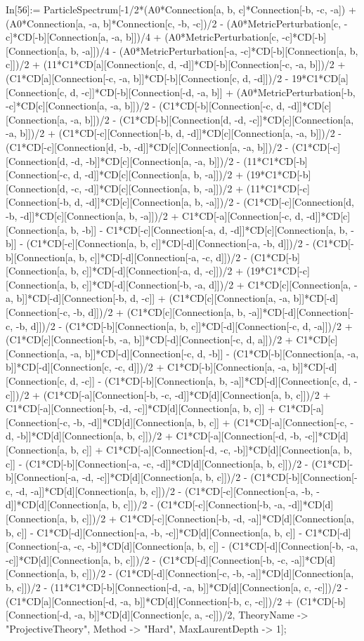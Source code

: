 In[56]:= ParticleSpectrum[-1/2*(A0*Connection[a, b, c]*Connection[-b, -c, -a]) + (A0*Connection[a, -a, b]*Connection[c, -b, -c])/2 - (A0*MetricPerturbation[c, -c]*CD[-b][Connection[a, -a, b]])/4 + (A0*MetricPerturbation[c, -c]*CD[-b][Connection[a, b, -a]])/4 - (A0*MetricPerturbation[-a, -c]*CD[-b][Connection[a, b, c]])/2 + (11*C1*CD[a][Connection[c, d, -d]]*CD[-b][Connection[-c, -a, b]])/2 + (C1*CD[a][Connection[-c, -a, b]]*CD[-b][Connection[c, d, -d]])/2 - 19*C1*CD[a][Connection[c, d, -c]]*CD[-b][Connection[-d, -a, b]] + (A0*MetricPerturbation[-b, -c]*CD[c][Connection[a, -a, b]])/2 - (C1*CD[-b][Connection[-c, d, -d]]*CD[c][Connection[a, -a, b]])/2 - (C1*CD[-b][Connection[d, -d, -c]]*CD[c][Connection[a, -a, b]])/2 + (C1*CD[-c][Connection[-b, d, -d]]*CD[c][Connection[a, -a, b]])/2 - (C1*CD[-c][Connection[d, -b, -d]]*CD[c][Connection[a, -a, b]])/2 - (C1*CD[-c][Connection[d, -d, -b]]*CD[c][Connection[a, -a, b]])/2 - (11*C1*CD[-b][Connection[-c, d, -d]]*CD[c][Connection[a, b, -a]])/2 + (19*C1*CD[-b][Connection[d, -c, -d]]*CD[c][Connection[a, b, -a]])/2 + (11*C1*CD[-c][Connection[-b, d, -d]]*CD[c][Connection[a, b, -a]])/2 - (C1*CD[-c][Connection[d, -b, -d]]*CD[c][Connection[a, b, -a]])/2 + C1*CD[-a][Connection[-c, d, -d]]*CD[c][Connection[a, b, -b]] - C1*CD[-c][Connection[-a, d, -d]]*CD[c][Connection[a, b, -b]] - (C1*CD[-c][Connection[a, b, c]]*CD[-d][Connection[-a, -b, d]])/2 - (C1*CD[-b][Connection[a, b, c]]*CD[-d][Connection[-a, -c, d]])/2 - (C1*CD[-b][Connection[a, b, c]]*CD[-d][Connection[-a, d, -c]])/2 + (19*C1*CD[-c][Connection[a, b, c]]*CD[-d][Connection[-b, -a, d]])/2 + C1*CD[c][Connection[a, -a, b]]*CD[-d][Connection[-b, d, -c]] + (C1*CD[c][Connection[a, -a, b]]*CD[-d][Connection[-c, -b, d]])/2 + (C1*CD[c][Connection[a, b, -a]]*CD[-d][Connection[-c, -b, d]])/2 - (C1*CD[-b][Connection[a, b, c]]*CD[-d][Connection[-c, d, -a]])/2 + (C1*CD[c][Connection[-b, -a, b]]*CD[-d][Connection[-c, d, a]])/2 + C1*CD[c][Connection[a, -a, b]]*CD[-d][Connection[-c, d, -b]] - (C1*CD[-b][Connection[a, -a, b]]*CD[-d][Connection[c, -c, d]])/2 + C1*CD[-b][Connection[a, -a, b]]*CD[-d][Connection[c, d, -c]] - (C1*CD[-b][Connection[a, b, -a]]*CD[-d][Connection[c, d, -c]])/2 + (C1*CD[-a][Connection[-b, -c, -d]]*CD[d][Connection[a, b, c]])/2 + C1*CD[-a][Connection[-b, -d, -c]]*CD[d][Connection[a, b, c]] + C1*CD[-a][Connection[-c, -b, -d]]*CD[d][Connection[a, b, c]] + (C1*CD[-a][Connection[-c, -d, -b]]*CD[d][Connection[a, b, c]])/2 + C1*CD[-a][Connection[-d, -b, -c]]*CD[d][Connection[a, b, c]] + C1*CD[-a][Connection[-d, -c, -b]]*CD[d][Connection[a, b, c]] - (C1*CD[-b][Connection[-a, -c, -d]]*CD[d][Connection[a, b, c]])/2 - (C1*CD[-b][Connection[-a, -d, -c]]*CD[d][Connection[a, b, c]])/2 - (C1*CD[-b][Connection[-c, -d, -a]]*CD[d][Connection[a, b, c]])/2 - (C1*CD[-c][Connection[-a, -b, -d]]*CD[d][Connection[a, b, c]])/2 - (C1*CD[-c][Connection[-b, -a, -d]]*CD[d][Connection[a, b, c]])/2 + C1*CD[-c][Connection[-b, -d, -a]]*CD[d][Connection[a, b, c]] - C1*CD[-d][Connection[-a, -b, -c]]*CD[d][Connection[a, b, c]] - C1*CD[-d][Connection[-a, -c, -b]]*CD[d][Connection[a, b, c]] - (C1*CD[-d][Connection[-b, -a, -c]]*CD[d][Connection[a, b, c]])/2 - (C1*CD[-d][Connection[-b, -c, -a]]*CD[d][Connection[a, b, c]])/2 - (C1*CD[-d][Connection[-c, -b, -a]]*CD[d][Connection[a, b, c]])/2 - (11*C1*CD[-b][Connection[-d, -a, b]]*CD[d][Connection[a, c, -c]])/2 - (C1*CD[a][Connection[-d, -a, b]]*CD[d][Connection[-b, c, -c]])/2 + (C1*CD[-b][Connection[-d, -a, b]]*CD[d][Connection[c, a, -c]])/2, TheoryName -> "ProjectiveTheory", Method -> "Hard", MaxLaurentDepth -> 1]; 